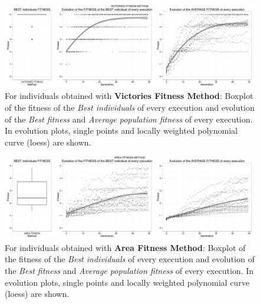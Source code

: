 \documentclass[preprint]{elsarticle}
\begin{document}



\begin{figure}[ht]
 \begin{center}
   \includegraphics[width=12cm]{nuevas_imgs/estudio_turns.pdf}
 \end{center}
 \caption{For individuals obtained with \textbf{Victories Fitness Method}: Boxplot of the fitness of the \emph{Best individuals} of every execution and evolution of the \emph{Best fitness} and \emph{Average population fitness} of every execution. In evolution plots, single points and locally weighted polynomial curve (loess) are shown.}
 \label{figura:fitness_turns}
 \end{figure}

   \begin{figure}[ht]
 \begin{center}
   \includegraphics[width=12cm]{nuevas_imgs/estudio_area.pdf}
 \end{center}
 \caption{For individuals obtained with \textbf{Area Fitness Method}: Boxplot of the fitness of the \emph{Best individuals} of every execution and evolution of the \emph{Best fitness} and \emph{Average population fitness} of every execution. In evolution plots, single points and locally weighted polynomial curve (loess) are shown.}
 \label{figura:fitness_area}
 \end{figure}
\end{document}
